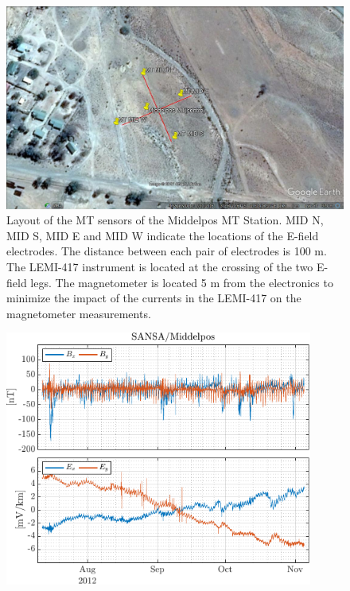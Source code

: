 \documentclass[draft,linenumbers]{agujournal2018}
\begin{document}
\begin{figure}[h]
  \centering
  \includegraphics[width=\textwidth]{figures/site.png}
  \caption{Layout of the MT sensors of the Middelpos MT Station. MID N, MID S, MID E and MID W indicate the locations of the E-field electrodes. The distance between each pair of electrodes is 100 m. The LEMI-417 instrument is located at the crossing of the two E-field legs. The magnetometer is located 5 m from the electronics to minimize the impact of the currents in the LEMI-417 on the magnetometer measurements. 
}
 \label{fig:site}
\end{figure}

\newpage

\begin{figure}[t]
  \centering
  \includegraphics[width=0.9\textwidth]{figures/tsplot-original-Middelpos-tf1.pdf}
  \caption{}
  \label{fig:timeseries}
\end{figure}
\end{document}
